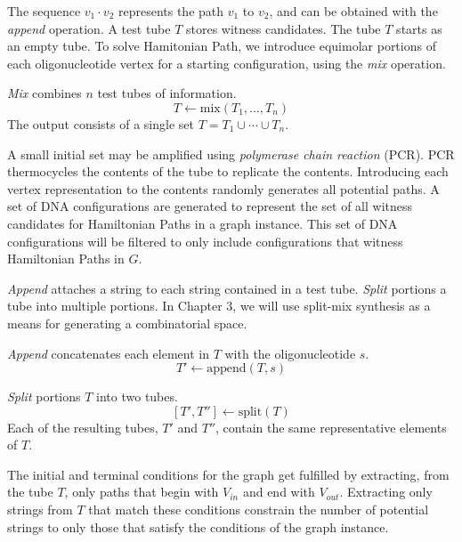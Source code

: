 The sequence $v_1 \cdot v_2$ represents the path $v_1$ to $v_2$, and can be obtained with the \textit{append} operation.  A test tube $T$ stores witness candidates.  The tube $T$ starts as an empty tube.  To solve {\sc Hamitonian Path}, we introduce equimolar portions of each oligonucleotide vertex for a starting configuration, using the \textit{mix} operation.

\begin{definition}
\emph{Mix} combines $n$ test tubes of information. 
\[
T \leftarrow \mathrm{mix}( T_1, \ldots , T_n)
\]
The output consists of a single set $T = T_1 \cup \cdots \cup T_n$.\\
\end{definition}

A small initial set may be amplified using \textit{polymerase chain reaction} (PCR).  PCR thermocycles the contents of the tube to replicate the contents.  Introducing each vertex representation to the contents randomly generates all potential paths.  A set of DNA configurations are generated to represent the set of all witness candidates for Hamiltonian Paths in a graph instance.  This set of DNA configurations will be filtered to only include configurations that witness Hamiltonian Paths in $G$.

\textit{Append} attaches a string to each string contained in a test tube.  \textit{Split} portions a tube into multiple portions.  In Chapter 3, we will use split-mix synthesis as a means for generating a combinatorial space.

\begin{definition}
\emph{Append} concatenates each element in $T$ with the oligonucleotide $s$.
\[
T' \leftarrow \mathrm{append}( T, s)
\]
\end{definition}

\begin{definition}
\emph{Split}  portions $T$ into two tubes.
\[
[T', T''] \leftarrow \mathrm{split}( T)
\]
Each of the resulting tubes, $T'$ and $T''$, contain the same representative elements of $T$. 
\end{definition}

The initial and terminal conditions for the graph get fulfilled by extracting, from the tube $T$, only paths that begin with $V_{in}$ and end with $V_{out}$.  Extracting only strings from $T$ that match these conditions constrain the number of potential strings to only those that satisfy the conditions of the graph instance.

